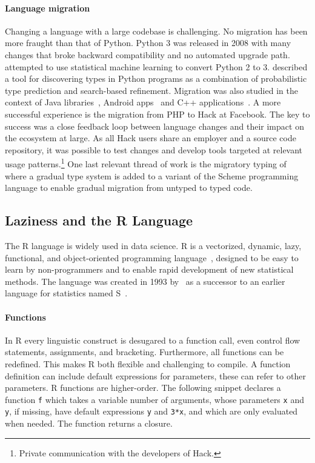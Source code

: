 \documentclass[screen,acmsmall]{acmart}
\renewcommand{\c}[1]{\lstinline |#1|\xspace}
\begin{document}
\paragraph{Language migration} Changing a language with a large codebase
is challenging. No migration has been more fraught than that of Python. Python 3
was released in 2008 with many changes that broke backward compatibility and no
automated upgrade path. \citet{Agg15} attempted to use statistical machine
learning to convert Python 2 to 3. \citet{Pra20} described a tool for
discovering types in Python programs as a combination of probabilistic type
prediction and search-based refinement. Migration was also studied in the
context of Java libraries~\cite{Xu19}, Android apps~\cite{Orso20} and C++
applications~\cite{OB20}. A more successful experience is the migration from PHP
to Hack at Facebook. The key to success was a close feedback loop between
language changes and their impact on the ecosystem at large. As all Hack users
share an employer and a source code repository, it was possible to test changes
and develop tools targeted at relevant usage patterns.\footnote{Private
  communication with the developers of Hack.} One last relevant thread of work
is the migratory typing of \citet{matthias06} where a gradual type system is
added to a variant of the Scheme programming language to enable gradual
migration from untyped to typed code.

\subsection{Laziness and the R Language}

The R language is widely used in data science. R is a vectorized, dynamic, lazy,
functional, and object-oriented programming language~\cite{ecoop12}, designed to
be easy to learn by non-programmers and to enable rapid development of new
statistical methods. The language was created in 1993 by~\citet{R96} as a
successor to an earlier language for statistics named S~\cite{S88}.

\paragraph{Functions}
In R every linguistic construct is desugared to a function call, even control
flow statements, assignments, and bracketing. Furthermore, all functions can be
redefined. This makes R both flexible and challenging to compile. A function
definition can include default expressions for parameters, these can refer to
other parameters. R functions are higher-order. The following snippet declares a
function \c f which takes a variable number of arguments, whose parameters
\c x and \c y, if missing, have default expressions \c y and
\c{3*x}, and which are only evaluated when needed. The function returns a
closure.
\end{document}
